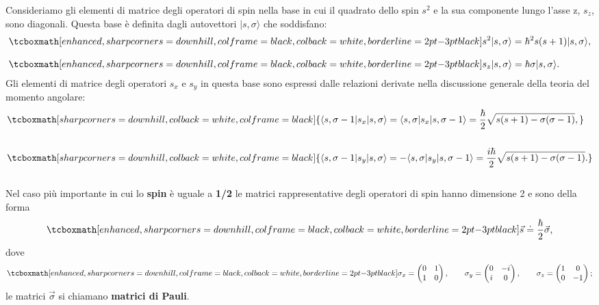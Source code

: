 Consideriamo gli elementi di matrice degli operatori di spin nella base in cui il quadrato dello spin $s^{2}$ e la sua componente lungo l'asse z, $s_{z}$, sono diagonali. Questa base è definita dagli autovettori $|s,\sigma\rangle$ che soddisfano:
	\begin{align}
		& \tcboxmath[enhanced, sharp corners=downhill, colframe=black, colback=white, borderline={2pt}{-3pt}{black}]{
			s^{2} |s, \sigma\rangle =\hbar^{2}s(s+1)|s, \sigma\rangle ,
			}\\[0.3cm]
		& \tcboxmath[enhanced, sharp corners=downhill, colframe=black, colback=white, borderline={2pt}{-3pt}{black}]{
			s_{z} |s, \sigma\rangle =\hbar \sigma |s, \sigma\rangle . 
			}
	\end{align}
Gli elementi di matrice degli operatori $s_{x}$ e $s_{y}$ in questa base sono espressi dalle relazioni derivate  nella discussione generale della teoria del momento angolare:
	\begin{align}
		& \tcboxmath[sharp corners=downhill, colback=white, colframe=black]{
	\langle s, \sigma -1\vert s_{x}\vert s, \sigma\rangle = \langle s, \sigma\vert s_{x}\vert s, \sigma -1\rangle =\frac{\hbar}{2}\sqrt{s(s+1)-\sigma(\sigma-1)} , \nonumber }\\
\\
		& \tcboxmath[sharp corners=downhill, colback=white, colframe=black]{\langle s, \sigma -1\vert s_{y}\vert s, \sigma\rangle =- \langle s, \sigma\vert s_{y}\vert s, \sigma -1\rangle =\frac{i\hbar}{2}\sqrt{s(s+1)-\sigma(\sigma-1)} . \nonumber }\\
	\end{align}\\
	
Nel caso più importante in cui lo \textbf{spin} è uguale a \textbf{1/2} le matrici rappresentative degli operatori di spin hanno dimensione 2 e sono della forma
	\begin{equation}
		\tcboxmath[enhanced, sharp corners=downhill, colframe=black, colback=white, borderline={2pt}{-3pt}{black}]{
			\vec{s}\doteq\frac{\hbar}{2}\vec{\sigma} ,
			}
	\end{equation}
dove
	\begin{equation}
		\tcboxmath[enhanced, sharp corners=downhill, colframe=black, colback=white, borderline={2pt}{-3pt}{black}]{
			\sigma_{x}=\begin{pmatrix}
			0 & 1 \\
			1 & 0
			\end{pmatrix}, \qquad \sigma_{y}=\begin{pmatrix}
			0 & -i \\
			i & 0
			\end{pmatrix},\qquad \sigma_{z}=\begin{pmatrix}
			1 & 0 \\
			0 & -1
			\end{pmatrix};
			}
	\end{equation}
le matrici $\vec{\sigma}$ si chiamano \textbf{matrici di Pauli}.\\

